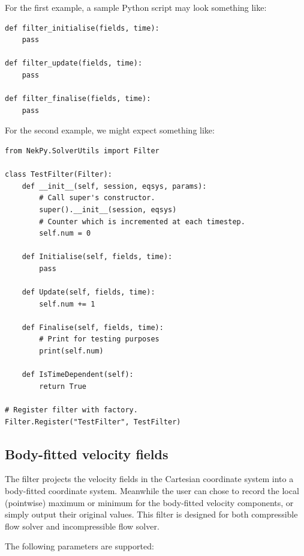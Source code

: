 For the first example, a sample Python script may look something like:

\begin{lstlisting}[style=PythonStyle]
def filter_initialise(fields, time):
    pass

def filter_update(fields, time):
    pass  

def filter_finalise(fields, time):
    pass
\end{lstlisting}

For the second example, we might expect something like:

\begin{lstlisting}[style=PythonStyle]
from NekPy.SolverUtils import Filter

class TestFilter(Filter):
    def __init__(self, session, eqsys, params):
        # Call super's constructor.
        super().__init__(session, eqsys)
        # Counter which is incremented at each timestep.
        self.num = 0

    def Initialise(self, fields, time):
        pass

    def Update(self, fields, time):
        self.num += 1

    def Finalise(self, fields, time):
        # Print for testing purposes
        print(self.num)

    def IsTimeDependent(self):
        return True

# Register filter with factory.
Filter.Register("TestFilter", TestFilter)
\end{lstlisting}

\subsection{Body-fitted velocity fields}\label{filters:BodyFittedVelocity}

The  filter projects the velocity fields in the Cartesian coordinate system into
a body-fitted coordinate system. Meanwhile the user can chose to record the local 
(pointwise) maximum or minimum for the body-fitted velocity components, or simply 
output their original values. This filter is designed for both compressible flow
solver and incompressible flow solver.

The following parameters are supported:

